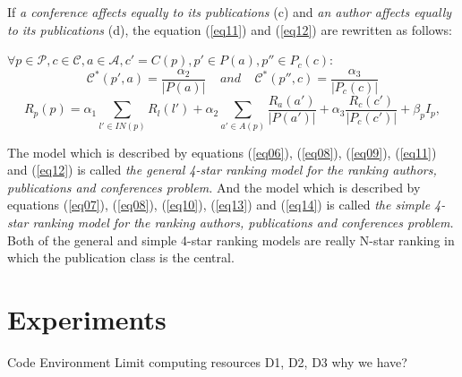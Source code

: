 \documentclass[10pt,leqno,twoside]{article}
\begin{document}
\begin{enumerate}
If \textit{a conference affects equally to  its publications} (c) and \textit{an author affects equally to  its publications} (d),  the equation (\ref{eq11}) and (\ref{eq12})  are rewritten as follows:

$\forall p\in\mathcal{P},  c\in\mathcal{C},  a\in\mathcal{A},c' = C(p), p'\in P(a), p''\in P_c(c):$
\setlength{\parskip}{3pt}
\begin{equation}\label{eq13}
\mathcal{C}^*(p',a)=\frac{\alpha_2}{|P(a)|}~~~~~and~~~~~\mathcal{C}^*(p'',c)=\frac{\alpha_3}{|P_c(c)|}
\end{equation}
\begin{equation}\label{eq14}
R_p(p) = \alpha_1\sum_{l'\in IN(p)}R_l(l') + \alpha_2\sum_{a'\in A(p)}\frac{R_a(a')}{|P(a')|} + \alpha_3\frac{R_c(c')}{|P_c(c')|} + \beta_pI_p,
\end{equation}
\end{enumerate}
The model which is described by equations (\ref{eq06}), (\ref{eq08}), (\ref{eq09}), (\ref{eq11}) and (\ref{eq12})
is called  \textit{ the general 4-star ranking model for the ranking authors, publications and conferences problem.} And the model which is described by equations (\ref{eq07}), (\ref{eq08}), (\ref{eq10}), (\ref{eq13}) and (\ref{eq14})
is called  \textit{ the simple 4-star ranking model for the ranking authors, publications and conferences problem.} Both of the general and simple  4-star ranking models are really N-star ranking in which the publication class is the central.


\section{Experiments}\label{Sect:Experiments}
Code
Environment
Limit computing resources
D1, D2, D3 why we have? 
\end{document}
